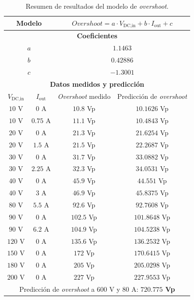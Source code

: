 \begin{table}[H]
	\centering
	\begin{tabular}{|c|c|c|c|}
		\hline
		\multicolumn{2}{|c|}{\textbf{Modelo}} & \multicolumn{2}{|c|}{$Overshoot = a \cdot V_{\text{DC,in}} + b \cdot I_{\text{out}} + c$} \\
		\hline
		\multicolumn{4}{|c|}{\textbf{Coeficientes}} \\
		\hline
		\multicolumn{2}{|c|}{$a$} & \multicolumn{2}{c|}{$1.1463$} \\
		\multicolumn{2}{|c|}{$b$} & \multicolumn{2}{c|}{$0.42886$} \\
		\multicolumn{2}{|c|}{$c$} & \multicolumn{2}{c|}{$-1.3001$} \\
		\hline
		\multicolumn{4}{|c|}{\textbf{Datos medidos y predicción}} \\
		\hline
		$V_{\text{DC,in}}$ & $I_{\text{out}}$ & \textit{Overshoot} medido & Predicción de \textit{overshoot} \\
		\hline
		$10$ V & $0$ A & $10.8$ Vp & $10.1626$ Vp \\
		$10$ V & $0.75$ A & $11.1$ Vp & $10.4843$ Vp \\
		$20$ V & $0$ A & $21.3$ Vp & $21.6254$ Vp \\
		$20$ V & $1.5$ A & $21.5$ Vp & $22.2687$ Vp \\
		$30$ V & $0$ A & $31.7$ Vp & $33.0882$ Vp \\
		$30$ V & $2.25$ A & $32.3$ Vp & $34.0531$ Vp \\
		$40$ V & $0$ A & $45.9$ Vp & $44.551$ Vp \\
		$40$ V & $3$ A & $46.9$ Vp & $45.8375$ Vp \\
		$80$ V & $5.5$ A & $92.6$ Vp & $92.7608$ Vp \\
		$90$ V & $0$ A & $102.5$ Vp & $101.8648$ Vp \\
		$90$ V & $6.2$ A & $104.9$ Vp & $104.5238$ Vp \\
		$120$ V & $0$ A & $135.6$ Vp & $136.2532$ Vp \\
		$150$ V & $0$ A & $172$ Vp & $170.6415$ Vp \\
		$180$ V & $0$ A & $205$ Vp & $205.0298$ Vp \\
		$200$ V & $0$ A & $227$ Vp & $227.9553$ Vp \\
		\hline
		\multicolumn{4}{|c|}{Predicción de \textit{overshoot} a $600$ V y $80$ A: {\color{red}\textbf{$720.775$ Vp}}} \\
		\hline
	\end{tabular}
	\caption{Resumen de resultados del modelo de \textit{overshoot}.}
\end{table}



